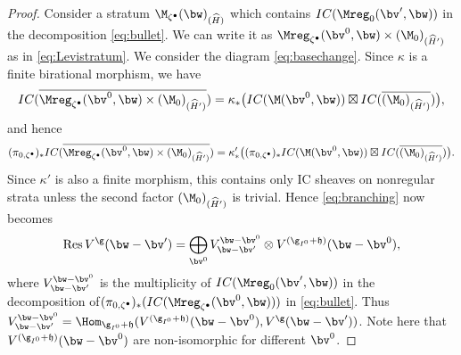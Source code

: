 \begin{proof}
Consider a stratum $\M_{\zeta^\bullet}(\bw)_{(\widehat H)}$ which
contains $IC(\Mreg_0(\bv',\bw))$ in the decomposition
\eqref{eq:bullet}. We can write it as
$\Mreg_{\zeta^\bullet}(\bv^0,\bw)\times (\M_0)_{(\widehat H')}$ as in
\eqref{eq:Levistratum}. We consider the diagram
\eqref{eq:basechange}. Since $\kappa$ is a f\/inite birational morphism,
we have
\begin{equation*}
  IC(\overline{\Mreg_{\zeta^\bullet}(\bv^0,\bw)
     \times (\M_0)_{(\widehat H')}})
   = \kappa_*\big(
     IC(\M(\bv^0,\bw))\boxtimes IC(\overline{(\M_0)_{(\widehat H')}})
   \big),
\end{equation*}
and hence
\begin{equation*}\label{eq:nonregular}
  (\pi_{0,\zeta^\bullet})_* IC(\overline{\Mreg_{\zeta^\bullet}(\bv^0,\bw)
     \times (\M_0)_{(\widehat H')}}) = \kappa'_*\big(
   (\pi_{0,\zeta^\bullet})_*IC(\M(\bv^0,\bw))\boxtimes
   IC(\overline{(\M_0)_{(\widehat H')}})\big).
\end{equation*}
Since $\kappa'$ is also a f\/inite morphism, this contains only IC
sheaves on nonregular strata unless the second factor
$(\M_0)_{(\widehat H')}$ is trivial.
%
Hence \eqref{eq:branching} now becomes
\begin{equation}\label{eq:restriction}
   \operatorname{Res} V^{\g}(\bw - \bv')
   = \bigoplus_{\bv^0} V_{\bw-\bv'}^{\bw-\bv^0}
   \otimes V^{(\g_{I^0}+\mathfrak h)}(\bw - \bv^0),
\end{equation}
where $V_{\bw-\bv'}^{\bw-\bv^0}$ is the multiplicity of
$IC(\Mreg_0(\bv',\bw))$ in the decomposition of\linebreak[2]
$(\pi_{0,\zeta^\bullet})_*\linebreak[2](IC(\Mreg_{\zeta^\bullet}(\bv^0,
\linebreak[2]\bw)))$ in
\eqref{eq:bullet}. Thus
$V_{\bw-\bv'}^{\bw-\bv^0} =
\Hom_{\g_{I^0}+\mathfrak h}
(V^{(\g_{I^0}+\mathfrak h)}(\bw - \bv^0), V^\g(\bw-\bv'))$.
%
Note here that $V^{(\g_{I^0}+\mathfrak h)}(\bw - \bv^0)$ are
non-isomorphic for dif\/ferent $\bv^0$.
\end{proof}
